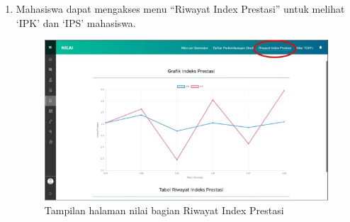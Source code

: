 \begin{enumerate}
\begin{enumerate}
\begin{figure}[H]
			\label{fig:nilai_2018}
		\end{figure}
		\item Mahasiswa dapat mengakses menu ``Riwayat Index Prestasi'' untuk melihat `IPK' dan `IPS' mahasiswa.
		\begin{figure}[H]
			\centering
			\includegraphics[scale=0.7]{Gambar/rip2018.jpg}
			\caption{Tampilan halaman nilai bagian Riwayat Index Prestasi} 
			\label{fig:rip_2018}
		\end{figure}
	\end{enumerate}	
\end{enumerate}
\newpage
